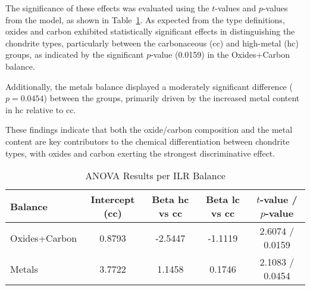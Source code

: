 The significance of these effects was evaluated using the \( t \)-values and \( p \)-values from the model, as shown in Table~\ref{tab:anova_ilr_results}. As expected from the type definitions, oxides and carbon exhibited statistically significant effects in distinguishing the chondrite types, particularly between the carbonaceous (cc) and high-metal (hc) groups, as indicated by the significant \( p \)-value (0.0159) in the Oxides+Carbon balance.

Additionally, the metals balance displayed a moderately significant difference (\( p = 0.0454 \)) between the groups, primarily driven by the increased metal content in hc relative to cc.

These findings indicate that both the oxide/carbon composition and the metal content are key contributors to the chemical differentiation between chondrite types, with oxides and carbon exerting the strongest discriminative effect.

\begin{table}[H]
\centering
\caption{ANOVA Results per ILR Balance}
\label{tab:anova_ilr_results}
\begin{tabular}{lcccc}
\toprule
\textbf{Balance} & \textbf{Intercept (cc)} & \textbf{Beta hc vs cc} & \textbf{Beta lc vs cc} & \textbf{$t$-value / $p$-value} \\
\midrule
Oxides+Carbon & 0.8793 & -2.5447 & -1.1119 & 2.6074 / 0.0159 \\
Metals & 3.7722 & 1.1458  & 0.1746  & 2.1083 / 0.0454 \\
\bottomrule
\end{tabular}
\end{table}
